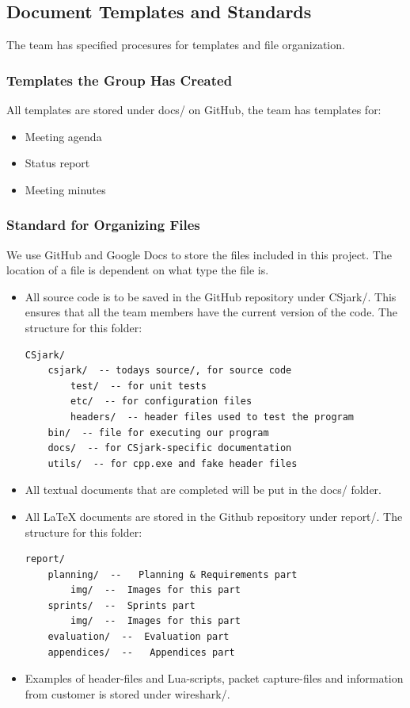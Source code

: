 \subsection{Document Templates and Standards}
The team has specified procesures for templates and file organization.

\subsubsection{Templates the Group Has Created}
All templates are stored under docs/ on GitHub, the team has templates for:

\begin{itemize}
	\item Meeting agenda
	\item Status report
	\item Meeting minutes
\end{itemize}

\subsubsection{Standard for Organizing Files}
We use GitHub and Google Docs to store the files included in this project. The
location of a file is dependent on what type the file is. 

\begin{itemize}
	\item All source code is to be saved in the GitHub repository under
		CSjark/. This ensures that all the team members have the current
		version of the code. The structure for this folder:
		\begin{verbatim}
CSjark/
    csjark/  -- todays source/, for source code
        test/  -- for unit tests
        etc/  -- for configuration files
        headers/  -- header files used to test the program
    bin/  -- file for executing our program
    docs/  -- for CSjark-specific documentation
    utils/  -- for cpp.exe and fake header files
		\end{verbatim}
	\item All textual documents that are completed will be put in the
		docs/ folder.
	\item All LaTeX documents are stored in the Github repository
		under report/. The structure for this folder:
		\begin{verbatim}
report/
    planning/  --   Planning & Requirements part
        img/  --  Images for this part
    sprints/  --  Sprints part
        img/  --  Images for this part
    evaluation/  --  Evaluation part
    appendices/  --   Appendices part
		\end{verbatim}
	\item Examples of header-files and Lua-scripts, packet capture-files and information from customer is stored under wireshark/.
\end{itemize}

